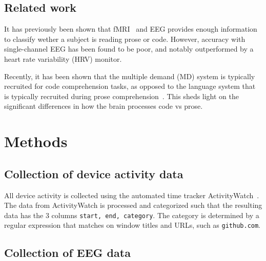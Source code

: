 \documentclass[a4paper]{article}
\begin{document}
\begin{refsection}

\subsection{Related work}

    It has previously been shown that fMRI~\cite{floyd_decoding_2017} and EEG\cite{fucci_replication_2019} provides enough information to classify wether a subject is reading prose or code. However, accuracy with single-channel EEG has been found to be poor, and notably outperformed by a heart rate variability (HRV) monitor.

    Recently, it has been shown that the multiple demand (MD) system is typically recruited for code comprehension tasks, as opposed to the language system that is typically recruited during prose comprehension~\cite{ivanova_comprehension_2020}. This sheds light on the significant differences in how the brain processes code vs prose.


\section{Methods}

    \subsection{Collection of device activity data}

        All device activity is collected using the automated time tracker ActivityWatch~\cite{bjareholt_activitywatch_2020-1}. The data from ActivityWatch is processed and categorized such that the resulting data has the 3 columns \texttt{start, end, category}. The category is determined by a regular expression that matches on window titles and URLs, such as \texttt{github.com}.


    \subsection{Collection of EEG data}


\end{refsection}
\end{document}
